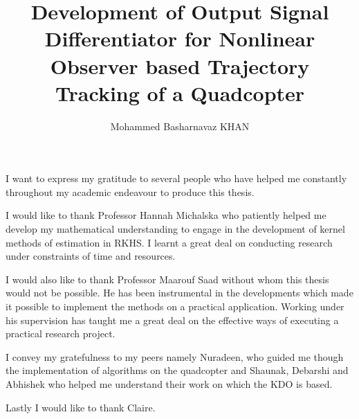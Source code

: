 \documentclass[letterpaper%
, twoside%
, 12pt%
,memoire%
, english%
,creativecommons,hyperref%
]{thETS}
\title{Development of Output Signal Differentiator for Nonlinear Observer based Trajectory Tracking of a Quadcopter}
\author{Mohammed Basharnavaz KHAN}
\theoremstyle{newThmStyle}
\begin{document}
\maketitle
\presentjury


\begin{acknowledgements}
I want to express my gratitude to several people who have helped me constantly throughout my academic endeavour to produce this thesis.

I would like to thank Professor Hannah Michalska who patiently helped me develop my mathematical understanding to engage in the development of kernel methods of estimation in RKHS. I learnt a great deal on conducting research under constraints of time and resources.

I would also like to thank Professor Maarouf Saad without whom this thesis would not be possible. He has been instrumental in the developments which made it possible to implement the methods on a practical application. Working under his supervision has taught me a great deal on the effective ways of executing a practical research project.

I convey my gratefulness to my peers namely Nuradeen, who guided me though the implementation of algorithms on the quadcopter and Shaunak, Debarshi and Abhishek who helped me understand their work on which the KDO is based. 

Lastly I would like to thank Claire. 
\end{acknowledgements}
\end{document}
